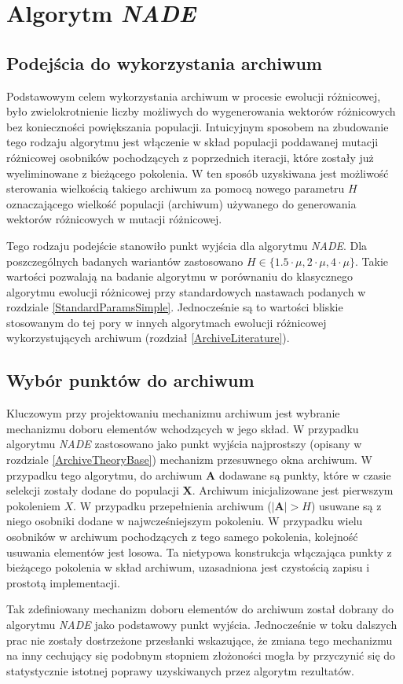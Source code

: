 \documentclass[12pt,a4paper]{report}
\begin{document}
{{{{{{{\section{Algorytm \emph{NADE}}
\subsection{Podejścia do wykorzystania archiwum}
\par{
Podstawowym celem wykorzystania archiwum w procesie ewolucji różnicowej, było zwielokrotnienie liczby możliwych do wygenerowania wektorów różnicowych bez konieczności powiększania populacji. Intuicyjnym sposobem na zbudowanie tego rodzaju algorytmu jest włączenie w skład populacji poddawanej mutacji różnicowej osobników pochodzących z poprzednich iteracji, które zostały już wyeliminowane z bieżącego pokolenia. W ten sposób uzyskiwana jest możliwość sterowania wielkością takiego archiwum za pomocą nowego parametru $H$ oznaczającego wielkość populacji (archiwum) używanego do generowania wektorów różnicowych w mutacji różnicowej.
}
\par{
Tego rodzaju podejście stanowiło punkt wyjścia dla algorytmu \emph{NADE}. Dla poszczególnych badanych wariantów zastosowano $H \in \{ 1.5 \cdot \mu, 2 \cdot \mu, 4 \cdot \mu \}$.  Takie wartości pozwalają na badanie algorytmu w porównaniu do klasycznego algorytmu ewolucji różnicowej przy standardowych nastawach podanych w rozdziale \ref{StandardParamsSimple}. Jednocześnie są to wartości bliskie stosowanym do tej pory w innych algorytmach ewolucji różnicowej wykorzystujących archiwum (rozdział \ref{ArchiveLiterature}).
}
\subsection{Wybór punktów do archiwum}
\par{
Kluczowym przy projektowaniu mechanizmu archiwum jest wybranie mechanizmu doboru elementów wchodzących w jego skład.
W przypadku algorytmu \emph{NADE} zastosowano jako punkt wyjścia najprostszy (opisany w rozdziale \ref{ArchiveTheoryBase}) mechanizm przesuwnego okna archiwum. W przypadku tego algorytmu, do archiwum $\mathbf{A}$ dodawane są punkty, które w czasie selekcji zostały dodane do populacji $\mathbf{X
}$. Archiwum inicjalizowane jest pierwszym pokoleniem $X$. W przypadku przepełnienia archiwum ($|\mathbf{A}| > H$) usuwane są z niego osobniki dodane w najwcześniejszym pokoleniu. W przypadku wielu osobników w archiwum pochodzących z tego samego pokolenia, kolejność usuwania elementów jest losowa. Ta nietypowa konstrukcja włączająca punkty z bieżącego pokolenia w skład archiwum, uzasadniona jest czystością zapisu i prostotą implementacji.
}
\par
Tak zdefiniowany mechanizm doboru elementów do archiwum został dobrany do algorytmu \emph{NADE} jako podstawowy punkt wyjścia. Jednocześnie w toku dalszych prac nie zostały dostrzeżone przesłanki wskazujące, że zmiana tego mechanizmu na inny cechujący się podobnym stopniem złożoności mogła by przyczynić się do statystycznie istotnej poprawy uzyskiwanych przez algorytm rezultatów.
}
}}}}}}
\end{document}
